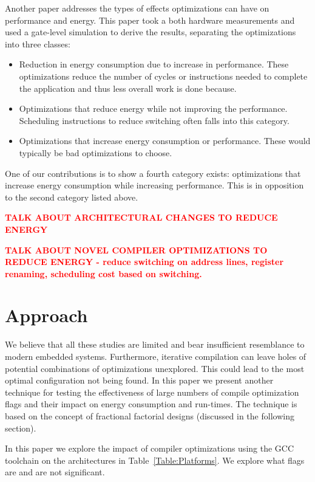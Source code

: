 \documentclass[twocolumn]{article}
\newcommand{\todo}[1]{\textbf{\textcolor{red}{#1}}}
\begin{document}
Another paper addresses the types of effects optimizations can have on performance and energy\cite{WhatCanAPoorCompilerDo}. This paper took a both hardware measurements and used a gate-level simulation to derive the results,  separating the optimizations into three classes:
\begin{itemize}
	\setlength{\itemsep}{0em}
	\vspace{-1mm}
	\item Reduction in energy consumption due to increase in performance. These optimizations reduce the number of cycles or instructions needed to complete the application and thus less overall work is done because.
	\item Optimizations that reduce energy while not improving the performance. Scheduling instructions to reduce switching often falls into this category.
	\item Optimizations that increase energy consumption or performance. These would typically be bad optimizations to choose.
\end{itemize}

One of our contributions is to show a fourth category exists: optimizations that increase energy consumption while increasing performance. This is in opposition to the second category listed above.

\todo{TALK ABOUT ARCHITECTURAL CHANGES TO REDUCE ENERGY}

\todo{TALK ABOUT NOVEL COMPILER OPTIMIZATIONS TO REDUCE ENERGY - reduce switching on address lines, register renaming, scheduling cost based on switching.}


\section*{Approach}

We believe that all these studies are limited and bear insufficient resemblance to modern embedded systems. Furthermore, iterative compilation can leave holes of potential combinations of optimizations unexplored. This could lead to the most optimal configuration not being found. In this paper we present another technique for testing the effectiveness of large numbers of compile optimization flags and their impact on energy consumption and run-times. The technique is based on the concept of fractional factorial designs (discussed in the following section).

In this paper we explore the impact of compiler optimizations using the GCC toolchain on the architectures in Table~\ref{Table:Platforms}. We explore what flags are and are not significant.
\end{document}
